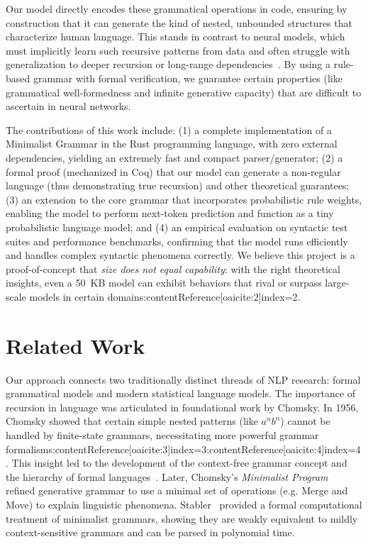 \documentclass[11pt]{article}
\begin{document}
Our model directly encodes these grammatical operations in code, ensuring by construction that it can generate the kind of nested, unbounded structures that characterize human language. This stands in contrast to neural models, which must implicitly learn such recursive patterns from data and often struggle with generalization to deeper recursion or long-range dependencies~\cite{linzen2016, gulordava2018}. By using a rule-based grammar with formal verification, we guarantee certain properties (like grammatical well-formedness and infinite generative capacity) that are difficult to ascertain in neural networks. 

The contributions of this work include: (1) a complete implementation of a Minimalist Grammar in the Rust programming language, with zero external dependencies, yielding an extremely fast and compact parser/generator; (2) a formal proof (mechanized in Coq) that our model can generate a non-regular language (thus demonstrating true recursion) and other theoretical guarantees; (3) an extension to the core grammar that incorporates probabilistic rule weights, enabling the model to perform next-token prediction and function as a tiny probabilistic language model; and (4) an empirical evaluation on syntactic test suites and performance benchmarks, confirming that the model runs efficiently and handles complex syntactic phenomena correctly. We believe this project is a proof-of-concept that \emph{size does not equal capability}: with the right theoretical insights, even a 50~KB model can exhibit behaviors that rival or surpass large-scale models in certain domains:contentReference[oaicite:2]{index=2}.

\section{Related Work}
Our approach connects two traditionally distinct threads of NLP research: formal grammatical models and modern statistical language models. The importance of recursion in language was articulated in foundational work by Chomsky. In 1956, Chomsky showed that certain simple nested patterns (like $a^n b^n$) cannot be handled by finite-state grammars, necessitating more powerful grammar formalisms:contentReference[oaicite:3]{index=3}:contentReference[oaicite:4]{index=4}. This insight led to the development of the context-free grammar concept and the hierarchy of formal languages~\cite{chomsky1956}. Later, Chomsky's \emph{Minimalist Program}~\cite{chomsky1995} refined generative grammar to use a minimal set of operations (e.g. Merge and Move) to explain linguistic phenomena. Stabler~\cite{stabler1997} provided a formal computational treatment of minimalist grammars, showing they are weakly equivalent to mildly context-sensitive grammars and can be parsed in polynomial time.
\end{document}

